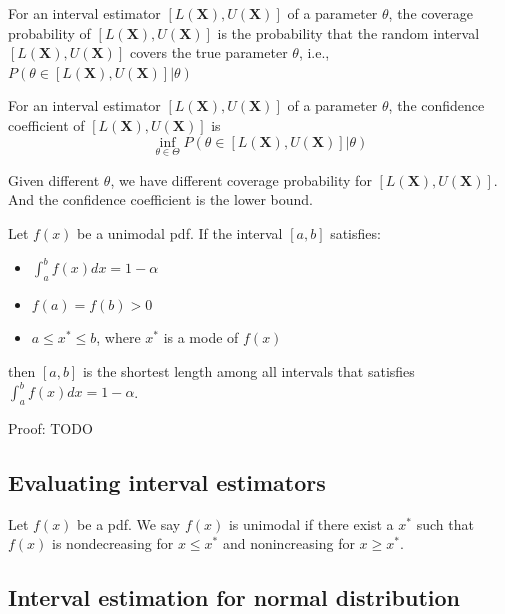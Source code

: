 \begin{refsection}
\begin{definition}
	\cite[418]{casella2002statistical} For an interval estimator $[L(\bm{X}),U(\bm{X})]$ of a parameter $\theta$, the coverage probability of $[L(\bm{X}),U(\bm{X})]$ is the probability that the random interval $[L(\bm{X}),U(\bm{X})]$ covers the true parameter $\theta$, i.e., $P(\theta\in [L(\bm{X}),U(\bm{X})]|\theta)$
\end{definition}

\begin{definition}
	\cite[418]{casella2002statistical} For an interval estimator $[L(\bm{X}),U(\bm{X})]$ of a parameter $\theta$, the confidence coefficient of $[L(\bm{X}),U(\bm{X})]$ is
	$$\inf_{\theta\in\Theta} P(\theta\in [L(\bm{X}),U(\bm{X})]|\theta)$$
\end{definition}

\begin{remark}
	Given different $\theta$, we have different coverage probability for $[L(\bm{X}),U(\bm{X})]$. And the confidence coefficient is the lower bound. 
\end{remark}

\begin{theorem}
	\cite[441]{casella2002statistical} Let $f(x)$ be a unimodal pdf. If the interval $[a,b]$ satisfies:
	\begin{itemize}
		\item $\int_a^b f(x)dx = 1-\alpha$
		\item $f(a)=f(b) > 0$
		\item $a\leq x^* \leq b$, where $x^*$ is a mode of $f(x)$
	\end{itemize}
	then $[a,b]$ is the shortest length among all intervals that satisfies $\int_a^b f(x)dx = 1-\alpha$.
\end{theorem}
Proof: TODO

\subsection{Evaluating interval estimators}
\begin{definition}
	Let $f(x)$ be a pdf. We say $f(x)$ is unimodal if there exist a $x^*$ such that $f(x)$ is nondecreasing for $x\leq x^*$ and nonincreasing for $x \geq x^*$.
\end{definition}


\subsection{Interval estimation for normal distribution}




\end{refsection}
